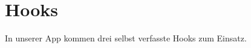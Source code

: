 \chapter{Hooks}
In unserer App kommen drei selbst verfasste Hooks zum Einsatz.


\newpage

\newpage

